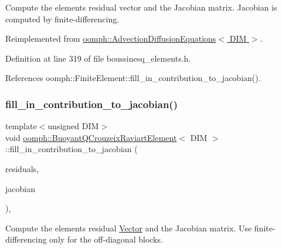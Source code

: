 Compute the element\textquotesingle{}s residual vector and the Jacobian matrix. Jacobian is computed by finite-\/differencing. 



Reimplemented from \hyperlink{classoomph_1_1AdvectionDiffusionEquations_a6ec1e0f92fa79998be9340ecfda4bcd5}{oomph\+::\+Advection\+Diffusion\+Equations$<$ D\+I\+M $>$}.



Definition at line 319 of file boussinesq\+\_\+elements.\+h.



References oomph\+::\+Finite\+Element\+::fill\+\_\+in\+\_\+contribution\+\_\+to\+\_\+jacobian().

\mbox{\label{classoomph_1_1BuoyantQCrouzeixRaviartElement_a7bd9313dd697c1219cee4a65692388b5}} 
\subsubsection{\texorpdfstring{fill\+\_\+in\+\_\+contribution\+\_\+to\+\_\+jacobian()}{fill\_in\_contribution\_to\_jacobian()}\hspace{0.1cm}{\footnotesize\ttfamily [2/3]}}
{\footnotesize\ttfamily template$<$unsigned D\+IM$>$ \\
void \hyperlink{classoomph_1_1BuoyantQCrouzeixRaviartElement}{oomph\+::\+Buoyant\+Q\+Crouzeix\+Raviart\+Element}$<$ D\+IM $>$\+::fill\+\_\+in\+\_\+contribution\+\_\+to\+\_\+jacobian (\begin{DoxyParamCaption}\item[{\hyperlink{classoomph_1_1Vector}{Vector}$<$ double $>$ \&}]{residuals,  }\item[{\hyperlink{classoomph_1_1DenseMatrix}{Dense\+Matrix}$<$ double $>$ \&}]{jacobian }\end{DoxyParamCaption})\hspace{0.3cm}{\ttfamily [inline]}, {\ttfamily [virtual]}}



Compute the element\textquotesingle{}s residual \hyperlink{classoomph_1_1Vector}{Vector} and the Jacobian matrix. Use finite-\/differencing only for the off-\/diagonal blocks. 



